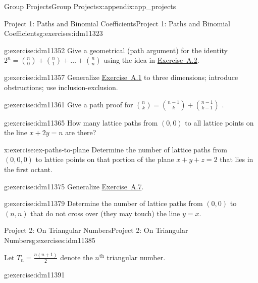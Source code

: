 \documentclass[oneside,10pt,]{book}
\numberwithin{equation}{chapter}
\begin{document}
\begin{appendixptx}{Group Projects}{}{Group Projects}{}{}{x:appendix:app_projects}
\begin{exercises-section-numberless}{Project 1: Paths and Binomial Coefficients}{}{Project 1: Paths and Binomial Coefficients}{}{}{g:exercises:idm11323}
\begin{divisionexercise}{3}{}{}{g:exercise:idm11352}
Give a geometrical (path argument) for the identity \(2^{n} =
\binom{n}{0}
+
\binom{n}{1}
+ \ldots +
\binom{n}{n}\) using the idea in \hyperlink{x:exercise:ex-paths-on-lines}{Exercise~A.2}.%
\end{divisionexercise}%
\begin{divisionexercise}{4}{}{}{g:exercise:idm11357}%
Generalize \hyperlink{x:exercise:ex-count-paths}{Exercise~A.1} to three dimensions; introduce obstructions; use inclusion-exclusion.%
\end{divisionexercise}%
\begin{divisionexercise}{5}{}{}{g:exercise:idm11361}%
Give a path proof for \(\binom{n}{k}
=
\binom{n - 1}{k}
+
\binom{n - 1}{k - 1}\) .%
\end{divisionexercise}%
\begin{divisionexercise}{6}{}{}{g:exercise:idm11365}%
How many lattice paths from \(\left( 0,0 \right)\) to all lattice points on the line \(x + 2y = n\) are there?%
\end{divisionexercise}%
\begin{divisionexercise}{7}{}{}{x:exercise:ex-paths-to-plane}%
Determine the number of lattice paths from \(\left( 0,0,0 \right)\) to lattice points on that portion of the plane \(x + y + z = 2\) that lies in the first octant.%
\end{divisionexercise}%
\begin{divisionexercise}{8}{}{}{g:exercise:idm11375}%
Generalize \hyperlink{x:exercise:ex-paths-to-plane}{Exercise~A.7}.%
\end{divisionexercise}%
\begin{divisionexercise}{9}{}{}{g:exercise:idm11379}%
Determine the number of lattice paths from \(\left( 0,0 \right)\) to \((n,n)\) that do not cross over (they may touch) the line \(y = x\).%
\end{divisionexercise}%
\end{exercises-section-numberless}
%
%
\typeout{************************************************}
\typeout{************************************************}
%
\begin{exercises-section-numberless}{Project 2: On Triangular Numbers}{}{Project 2: On Triangular Numbers}{}{}{g:exercises:idm11385}
\begin{introduction}{}%
Let \(T_{n} = \frac{n\left( n + 1 \right)}{2}\) denote the \(n^{\text{th}}\) triangular number.%
\end{introduction}%
\begin{divisionexercise}{1}{}{}{g:exercise:idm11391}%

\end{divisionexercise}
\end{exercises-section-numberless}
\end{appendixptx}
\end{document}
